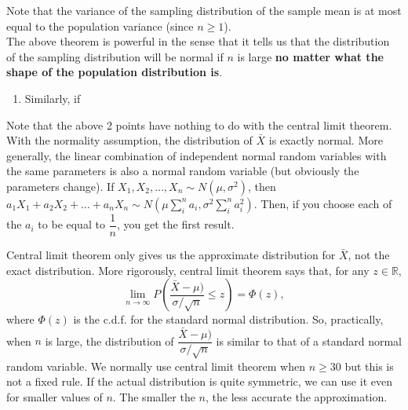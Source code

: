 Note that the variance of the sampling distribution of the sample mean is at most equal to the population variance (since $n \geq 1$). \\
The above theorem is powerful in the sense that it tells us that the distribution of the sampling distribution will be normal if $n$ is large \textbf{no matter what the shape of the population distribution is}.
\begin{enumerate}
    \item Similarly, if 
\end{enumerate}
Note that the above 2 points have nothing to do with the central limit theorem. With the normality assumption, the distribution of $\bar{X}$ is exactly normal. More generally, the linear combination of independent normal random variables with the same parameters is also a normal random variable (but obviously the parameters change).
If $X_1, X_2, \dots, X_n \sim N(\mu, \sigma^2)$, then $a_1 X_1 + a_2 X_2 + \dots + a_n X_n \sim N(\mu \sum_{i}^n a_i, \sigma^2 \sum_{i}^n a_i^2)$. Then, if you choose each of the $a_i$ to be equal to $\dfrac{1}{n}$, you get the first result.
\begin{note}
\end{note}
Central limit theorem only gives us the approximate distribution for $\bar{X}$, not the exact distribution. More rigorously, central limit theorem says that, for any $z \in \mathbb{R}$, 
$$
\lim_{n \xrightarrow{} \infty} P\left(\dfrac{\bar{X} - \mu)}{\sigma/\sqrt{n}} \leq z \right) = \Phi(z),
$$ where $\Phi(z)$ is the c.d.f. for the standard normal distribution.
So, practically, when $n$ is large, the distribution of $\dfrac{\bar{X} - \mu)}{\sigma/\sqrt{n}}$ is similar to that of a standard normal random variable. We normally use central limit theorem when $n \geq 30$ but this is not a fixed rule. If the actual distribution is quite symmetric, we can use it even for smaller values of $n$. The smaller the $n$, the less accurate the approximation.
